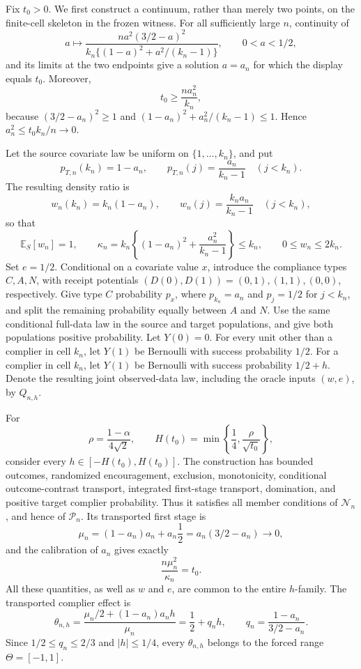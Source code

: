 Fix \(t_0>0\).  We first construct a continuum, rather than merely two points, on the finite-cell skeleton in the frozen witness.  For all sufficiently large \(n\), continuity of
\[
 a\longmapsto \frac{n a^2(3/2-a)^2}{k_n\{(1-a)^2+a^2/(k_n-1)\}},\qquad 0<a<1/2,
\]
and its limits at the two endpoints give a solution \(a=a_n\) for which the display equals \(t_0\).  Moreover,
\[
 t_0\ge \frac{n a_n^2}{k_n},
\]
because \((3/2-a_n)^2\ge1\) and \((1-a_n)^2+a_n^2/(k_n-1)\le1\).  Hence \(a_n^2\le t_0k_n/n\to0\).

Let the source covariate law be uniform on \(\{1,\ldots,k_n\}\), and put
\[
 p_{T,n}(k_n)=1-a_n,\qquad p_{T,n}(j)=\frac{a_n}{k_n-1}\quad(j<k_n).
\]
The resulting density ratio is
\[
 w_n(k_n)=k_n(1-a_n),\qquad w_n(j)=\frac{k_na_n}{k_n-1}\quad(j<k_n),
\]
so that
\[
 \mathbb E_S[w_n]=1,\qquad
 \kappa_n=k_n\left\{(1-a_n)^2+\frac{a_n^2}{k_n-1}\right\}\le k_n,\qquad 0\le w_n\le2k_n.
\]
Set \(e=1/2\).  Conditional on a covariate value \(x\), introduce the compliance types \(C,A,N\), with receipt potentials \((D(0),D(1))=(0,1),(1,1),(0,0)\), respectively.  Give type \(C\) probability \(p_x\), where \(p_{k_n}=a_n\) and \(p_j=1/2\) for \(j<k_n\), and split the remaining probability equally between \(A\) and \(N\).  Use the same conditional full-data law in the source and target populations, and give both populations positive probability.  Let \(Y(0)=0\).  For every unit other than a complier in cell \(k_n\), let \(Y(1)\) be Bernoulli with success probability \(1/2\).  For a complier in cell \(k_n\), let \(Y(1)\) be Bernoulli with success probability \(1/2+h\).  Denote the resulting joint observed-data law, including the oracle inputs \((w,e)\), by \(Q_{n,h}\).

For
\[
 \rho=\frac{1-\alpha}{4\sqrt2},\qquad
 H(t_0)=\min\left\{\frac14,\frac{\rho}{\sqrt{t_0}}\right\},
\]
consider every \(h\in[-H(t_0),H(t_0)]\).  The construction has bounded outcomes, randomized encouragement, exclusion, monotonicity, conditional outcome-contrast transport, integrated first-stage transport, domination, and positive target complier probability.  Thus it satisfies all member conditions of \(\mathcal N_n\), and hence of \(\mathcal P_n\).  Its transported first stage is
\[
 \mu_n=(1-a_n)a_n+a_n\frac12=a_n(3/2-a_n)\longrightarrow0,
\]
and the calibration of \(a_n\) gives exactly
\[
 \frac{n\mu_n^2}{\kappa_n}=t_0.
\]
All these quantities, as well as \(w\) and \(e\), are common to the entire \(h\)-family.  The transported complier effect is
\[
 \theta_{n,h}=\frac{\mu_n/2+(1-a_n)a_n h}{\mu_n}
 =\frac12+q_nh,\qquad q_n=\frac{1-a_n}{3/2-a_n}.
\]
Since \(1/2\le q_n\le2/3\) and \(|h|\le1/4\), every \(\theta_{n,h}\) belongs to the forced range \(\Theta=[-1,1]\).

